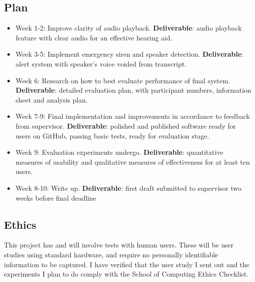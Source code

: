 \documentclass[11pt]{article}
\begin{document}
\subsection{Plan}

\begin{itemize}
    \item Week 1-2: Improve clarity of audio playback. \textbf{Deliverable}: audio playback feature with clear audio for an effective hearing aid.
    \item Week 3-5: Implement emergency siren and speaker detection. \textbf{Deliverable}: alert system with speaker’s voice voided from transcript.
    \item Week 6: Research on how to best evaluate performance of final system. \textbf{Deliverable}: detailed evaluation plan, with participant numbers, information sheet and analysis plan.
    \item Week 7-9: Final implementation and improvements in accordance to feedback from supervisor. \textbf{Deliverable}: polished and published software ready for users on GitHub, passing basic tests, ready for evaluation stage.
    \item Week 9: Evaluation experiments undergo. \textbf{Deliverable}: quantitative measures of usability and qualitative measures of effectiveness for at least ten users.
    \item Week 8-10: Write up. \textbf{Deliverable}: first draft submitted to supervisor two weeks before final deadline
\end{itemize}

\subsection{Ethics}

This project has and will involve tests with human users. These will be user studies using standard hardware, and require no personally identifiable information to be captured. I have verified that the user study I sent out and the experiments I plan to do comply with the School of Computing Ethics Checklist.




\end{document}
